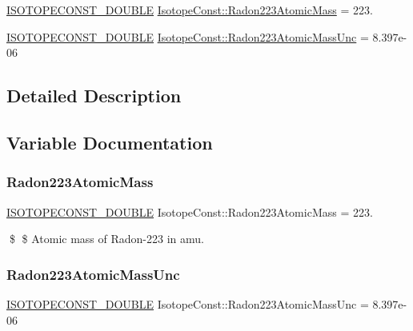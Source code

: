 \begin{DoxyCompactItemize}
\item 
\mbox{\hyperlink{group___isotope_const-_macros_ga8f45a7272ce02c0b4c65c44636ed719a}{I\+S\+O\+T\+O\+P\+E\+C\+O\+N\+S\+T\+\_\+\+D\+O\+U\+B\+LE}} \mbox{\hyperlink{group___isotope_const-_radon-_rn223_gafbf053e63d56d27895ceef0840263f03}{Isotope\+Const\+::\+Radon223\+Atomic\+Mass}} = 223.
\item 
\mbox{\hyperlink{group___isotope_const-_macros_ga8f45a7272ce02c0b4c65c44636ed719a}{I\+S\+O\+T\+O\+P\+E\+C\+O\+N\+S\+T\+\_\+\+D\+O\+U\+B\+LE}} \mbox{\hyperlink{group___isotope_const-_radon-_rn223_ga224d808041d3e1e511cc5a26270dbc0d}{Isotope\+Const\+::\+Radon223\+Atomic\+Mass\+Unc}} = 8.\+397e-\/06
\end{DoxyCompactItemize}


\subsection{Detailed Description}


\subsection{Variable Documentation}
\mbox{\label{group___isotope_const-_radon-_rn223_gafbf053e63d56d27895ceef0840263f03}} 
\subsubsection{\texorpdfstring{Radon223\+Atomic\+Mass}{Radon223AtomicMass}}
{\footnotesize\ttfamily \mbox{\hyperlink{group___isotope_const-_macros_ga8f45a7272ce02c0b4c65c44636ed719a}{I\+S\+O\+T\+O\+P\+E\+C\+O\+N\+S\+T\+\_\+\+D\+O\+U\+B\+LE}} Isotope\+Const\+::\+Radon223\+Atomic\+Mass = 223.}

\$ \$ Atomic mass of Radon-\/223 in amu. \mbox{\label{group___isotope_const-_radon-_rn223_ga224d808041d3e1e511cc5a26270dbc0d}} 
\subsubsection{\texorpdfstring{Radon223\+Atomic\+Mass\+Unc}{Radon223AtomicMassUnc}}
{\footnotesize\ttfamily \mbox{\hyperlink{group___isotope_const-_macros_ga8f45a7272ce02c0b4c65c44636ed719a}{I\+S\+O\+T\+O\+P\+E\+C\+O\+N\+S\+T\+\_\+\+D\+O\+U\+B\+LE}} Isotope\+Const\+::\+Radon223\+Atomic\+Mass\+Unc = 8.\+397e-\/06}

